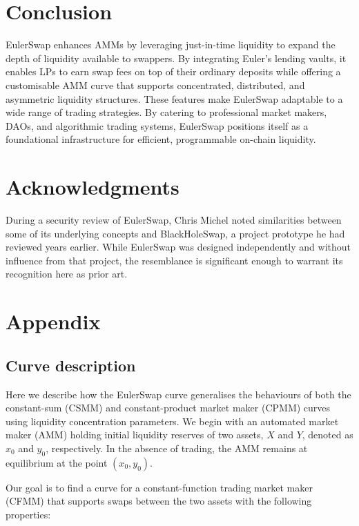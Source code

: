 \documentclass{article}
\begin{document}
\section{Conclusion}

EulerSwap enhances AMMs by leveraging just-in-time liquidity to expand the depth of liquidity available to swappers. By integrating Euler’s lending vaults, it enables LPs to earn swap fees on top of their ordinary deposits while offering a customisable AMM curve that supports concentrated, distributed, and asymmetric liquidity structures. These features make EulerSwap adaptable to a wide range of trading strategies. By catering to professional market makers, DAOs, and algorithmic trading systems, EulerSwap positions itself as a foundational infrastructure for efficient, programmable on-chain liquidity. 

\section*{Acknowledgments}

During a security review of EulerSwap, Chris Michel noted similarities between some of its underlying concepts and BlackHoleSwap, a project prototype he had reviewed years earlier. While EulerSwap was designed independently and without influence from that project, the resemblance is significant enough to warrant its recognition here as prior art.

\newpage
\section{Appendix}
\label{sec:appendix}

\subsection{Curve description}
\label{sec:curve-description}

Here we describe how the EulerSwap curve generalises the behaviours of both the constant-sum (CSMM) and constant-product market maker (CPMM) curves using liquidity concentration parameters. We begin with an automated market maker (AMM) holding initial liquidity reserves of two assets, $X$ and $Y$, denoted as $x_0$ and $y_0$, respectively. In the absence of trading, the AMM remains at equilibrium at the point $(x_0, y_0)$. 

Our goal is to find a curve for a constant-function trading market maker (CFMM) that supports swaps between the two assets with the following properties:
\end{document}
